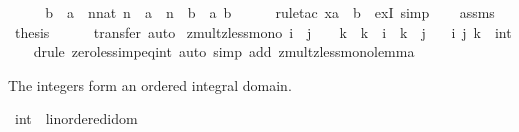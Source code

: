 \begin{isabellebody}
%
\isadelimproof
%
\endisadelimproof
%
\isatagproof
{}\isamarkupfalse%
\ {\isacharminus}{\kern0pt}\isanewline
\ \ \isamarkupfalse%
\ {\isachardoublequoteopen}b\ {\isacharless}{\kern0pt}\ a\ {\isasymLongrightarrow}\ {\isasymexists}n{\isacharcolon}{\kern0pt}{\isacharcolon}{\kern0pt}nat{\isachardot}{\kern0pt}\ n{\isachargreater}{\kern0pt}{}\ {\isasymand}\ a\ {\isacharequal}{\kern0pt}\ n\ {\isacharplus}{\kern0pt}\ b{\isachardoublequoteclose}\ \ a\ b\isanewline
\ \ \ \ \isamarkupfalse%
\ {\isacharparenleft}{\kern0pt}rule{\isacharunderscore}{\kern0pt}tac\ x{\isacharequal}{\kern0pt}{\isachardoublequoteopen}a\ {\isacharminus}{\kern0pt}\ b{\isachardoublequoteclose}\ \ exI{\isacharparenright}{\kern0pt}\ simp\isanewline
\ \ \isamarkupfalse%
\ assms\ \isamarkupfalse%
\ {\isacharquery}{\kern0pt}thesis\isanewline
\ \ \ \ \isamarkupfalse%
\ transfer\ auto\isanewline
{}\isamarkupfalse%
%
\endisatagproof
{\isafoldproof}%
%
\isadelimproof
\isanewline
%
\endisadelimproof
\isanewline
{}\isamarkupfalse%
\ zmult{\isacharunderscore}{\kern0pt}zless{\isacharunderscore}{\kern0pt}mono{}{\isacharcolon}{\kern0pt}\ {\isachardoublequoteopen}i\ {\isacharless}{\kern0pt}\ j\ {\isasymLongrightarrow}\ {}\ {\isacharless}{\kern0pt}\ k\ {\isasymLongrightarrow}\ k\ {\isacharasterisk}{\kern0pt}\ i\ {\isacharless}{\kern0pt}\ k\ {\isacharasterisk}{\kern0pt}\ j{\isachardoublequoteclose}\isanewline
\ \ \ i\ j\ k\ {\isacharcolon}{\kern0pt}{\isacharcolon}{\kern0pt}\ int\isanewline
%
\isadelimproof
\ \ %
\endisadelimproof
%
\isatagproof
{}\isamarkupfalse%
\ {\isacharparenleft}{\kern0pt}drule\ zero{\isacharunderscore}{\kern0pt}less{\isacharunderscore}{\kern0pt}imp{\isacharunderscore}{\kern0pt}eq{\isacharunderscore}{\kern0pt}int{\isacharparenright}{\kern0pt}\ {\isacharparenleft}{\kern0pt}auto\ simp\ add{\isacharcolon}{\kern0pt}\ zmult{\isacharunderscore}{\kern0pt}zless{\isacharunderscore}{\kern0pt}mono{}{\isacharunderscore}{\kern0pt}lemma{\isacharparenright}{\kern0pt}%
\endisatagproof
{\isafoldproof}%
%
\isadelimproof
%
\endisadelimproof
%
\begin{isamarkuptext}%
The integers form an ordered integral domain.%
\end{isamarkuptext}\isamarkuptrue%
\isamarkupfalse%
\ int\ {\isacharcolon}{\kern0pt}{\isacharcolon}{\kern0pt}\ linordered{\isacharunderscore}{\kern0pt}idom\isanewline

\end{isabellebody}
